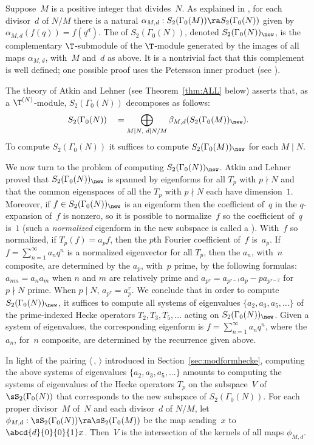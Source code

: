 Suppose~$M$ is a positive integer that divides~$N$.  As explained in
\cite[VIII.1--2]{lang:modular}, for each divisor~$d$ of $N/M$ there is
a natural  $\alpha_{M,d} : S_2(\Gamma_0(M))\ra
S_2(\Gamma_0(N))$ given by $\alpha_{M,d}(f(q)) = f(q^d)$.  The
 of $S_2(\Gamma_0(N))$, denoted
$S_2(\Gamma_0(N))_{\new}$, is the complementary $\T$-submodule of the
$\T$-module generated by the images of all maps $\alpha_{M,d}$,
with~$M$ and~$d$ as above.  It is a nontrivial fact that this
complement is well defined; one possible proof uses the Petersson
inner product (see \cite[\S{}VII.5]{lang:modular}).

The theory of Atkin and Lehner \cite{atkin-lehner} (see
Theorem~\ref{thm:ALL} below) asserts that, as a $\T^{(N)}$-module,
$S_2(\Gamma_0(N))$ decomposes as follows:
$$S_2(\Gamma_0(N)) \quad = 
\bigoplus_{M | N, \,\, d | N/M}
\beta_{M,d}(S_2(\Gamma_0(M))_{\new}).$$ 
To compute $S_2(\Gamma_0(N))$ it suffices to compute
$S_2(\Gamma_0(M))_{\new}$ for each $M\mid N$.

We now turn to the problem of computing $S_2(\Gamma_0(N))_{\new}$.
Atkin and Lehner \cite{atkin-lehner} proved that
$S_2(\Gamma_0(N))_{\new}$ is spanned by eigenforms for all $T_p$ with
$p\nmid N$ and that the common eigenspaces of all the $T_p$ with
$p\nmid N$ each have dimension~$1$.  Moreover, if $f\in
S_2(\Gamma_0(N))_{\new}$ is an eigenform then the coefficient of~$q$
in the $q$-expansion of~$f$ is nonzero, so it is possible to
normalize~$f$ so the coefficient of~$q$ is~$1$ (such a {\em
  normalized} eigenform in the new subspace is called a
).  With~$f$ so normalized, if $T_p(f) = a_p f$, then
the $p$th Fourier coefficient of~$f$ is~$a_p$.  If
$f=\sum_{n=1}^{\infty} a_n q^n$ is a normalized eigenvector for all
$T_p$, then the $a_n$, with~$n$ composite, are determined by the
$a_p$, with~$p$ prime, by the following formulas: $a_{nm}=a_n a_m$
when $n$ and $m$ are relatively prime and $a_{p^r} = a_{p^{r-1}} a_p
- p a_{p^{r-2}}$ for $p\nmid N$ prime.  When $p \mid N$,
$a_{p^r}=a_p^r$.  We conclude that in order to compute
$S_2(\Gamma_0(N))_{\new}$, it suffices to compute all systems of
eigenvalues $\{a_2, a_3, a_5, \ldots\}$ of the prime-indexed Hecke
operators $T_2, T_3, T_5, \ldots$ acting on $S_2(\Gamma_0(N))_{\new}$.
Given a system of eigenvalues, the corresponding eigenform is
$f=\sum_{n=1}^{\infty} a_n q^n$, where the $a_n$, for~$n$ composite,
are determined by the recurrence given above.

In light of the pairing $\langle\, ,\, \rangle$ introduced in 
Section~\ref{sec:modformhecke}, 
computing the above systems of eigenvalues $\{a_2,a_3, a_5, \ldots \}$
amounts to computing the systems of eigenvalues of the Hecke operators
$T_p$ on the subspace~$V$ of $\sS_2(\Gamma_0(N))$ that corresponds
to the new subspace of $S_2(\Gamma_0(N)).$
For each proper divisor~$M$ of~$N$ and each divisor~$d$ of
$N/M$, let $\phi_{M,d}:\sS_2(\Gamma_0(N)) \ra \sS_2(\Gamma_0(M))$ be the map
sending~$x$ to $\abcd{d}{0}{0}{1}x$. 
Then~$V$ is the intersection of the kernels of all
maps $\phi_{M,d}$.

